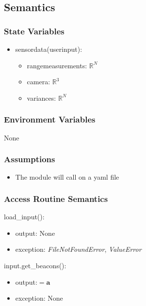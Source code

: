 \documentclass[12pt, titlepage]{article}
\begin{document}
\subsection{Semantics}

\subsubsection{State Variables}
\begin{itemize}
  \item sensor\textunderscore data(user\textunderscore input): 
  \begin{itemize}
    \item range\textunderscore measurements: $\mathbb{R}^N$
    \item camera: $\mathbb{R}^3$
    \item variances: $\mathbb{R}^N$
  \end{itemize}
\end{itemize}

\subsubsection{Environment Variables}
None

\subsubsection{Assumptions}
\begin{itemize}
  \item The module will call on a yaml file
\end{itemize}

\subsubsection{Access Routine Semantics}

\noindent load\_input():
\begin{itemize}
    \item output: None
    \item exception: \textit{FileNotFoundError}, \textit{ValueError}
\end{itemize}

\noindent input.get\_beacons():
\begin{itemize}
    \item output:$=\mathbf{a}$
    \item exception: None
\end{itemize}
\end{document}
